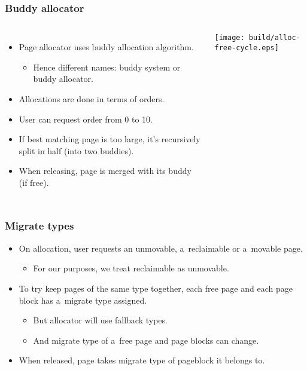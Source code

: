 \begin{frame}
  \frametitle{Buddy allocator}
  \begin{columns}[c]

    \begin{itemize}
    \item Page allocator uses buddy allocation algorithm.
      \begin{itemize}
      \item Hence different names: buddy system or buddy allocator.
      \end{itemize}
    \item Allocations are done in terms of orders.
    \item User can request order from 0 to 10.
    \item If best matching page is too large, it's recursively split
      in half (into two buddies).
    \item When releasing, page is merged with its buddy (if free).
    \end{itemize}

    \begin{center}
    \texttt{[image: build/alloc-free-cycle.eps]}
    \end{center}
  \end{columns}
\end{frame}

\begin{frame}[fragile]
  \frametitle{Migrate types}

  \begin{itemize}
  \item On allocation, user requests an unmovable, a~reclaimable or
    a~movable page.
    \begin{itemize}
    \item For our purposes, we treat reclaimable as unmovable.
    \end{itemize}
  \item To try keep pages of the same type together, each free page
    and each page block has a~migrate type assigned.
    \begin{itemize}
    \item But allocator will use fallback types.
    \item And migrate type of a~free page and page blocks can change.
    \end{itemize}
  \item When released, page takes migrate type of pageblock it belongs
    to.
  \end{itemize}
\end{frame}
